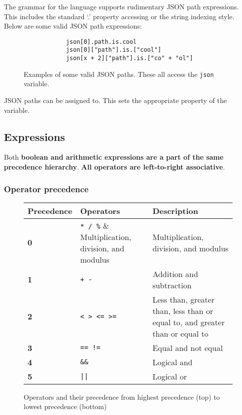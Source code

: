 \documentclass[12pt, letterpaper]{article}
\begin{document}
The grammar for the language supports rudimentary JSON path expressions. This includes the standard `.' property accessing or the string indexing style. Below are some valid JSON path expressions:

\begin{figure}[H]
    \begin{center}
        \begin{verbatim}
            json[0].path.is.cool
            json[0]["path"].is.["cool"]
            json[x + 2]["path"].is.["co" + "ol"]
        \end{verbatim}
    \end{center}
    \vspace{-1.5em}
    \cprotect\caption{Examples of some valid JSON paths. These all access the \verb|json| variable.}
\end{figure}

JSON paths can be assigned to. This sets the appropriate property of the variable.

\subsection{Expressions}
\label{sec:expressions}

Both \textbf{boolean and arithmetic expressions are a part of the same precedence hierarchy}. \textbf{All operators are left-to-right associative}.

\subsubsection{Operator precedence}

\begin{figure}[H]
    \begin{center}
        \begin{tabular}{| m{2cm} | m{2cm} | m{5cm} |}
            \hline
            Precedence & Operators & Description\\
            \hline
            \textbf{0} & \verb|* / %| & Multiplication, division, and modulus\\
            \hline
            \textbf{1} & \verb|+ -| & Addition and subtraction\\
            \hline
            \textbf{2} & \verb|< > <= >=| & Less than, greater than, less than or equal to, and greater than or equal to\\
            \hline
            \textbf{3} & \verb|== !=| & Equal and not equal\\
            \hline
            \textbf{4} & \verb|&&| & Logical and\\
            \hline
            \textbf{5} & \verb+||+ & Logical or\\
            \hline
        \end{tabular}
    \end{center}
    \caption{Operators and their precedence from highest precedence (top) to lowest precedence (bottom)}
\end{figure}
\end{document}

